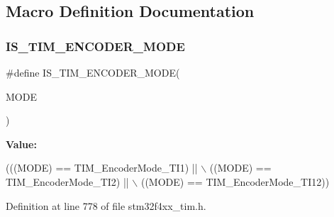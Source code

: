 \subsection{Macro Definition Documentation}
\mbox{\label{group___t_i_m___encoder___mode_ga9dd5baa6b2a44e0f25068a650cbfdd1b}} 
\subsubsection{\texorpdfstring{I\+S\+\_\+\+T\+I\+M\+\_\+\+E\+N\+C\+O\+D\+E\+R\+\_\+\+M\+O\+DE}{IS\_TIM\_ENCODER\_MODE}}
{\footnotesize\ttfamily \#define I\+S\+\_\+\+T\+I\+M\+\_\+\+E\+N\+C\+O\+D\+E\+R\+\_\+\+M\+O\+DE(\begin{DoxyParamCaption}\item[{}]{M\+O\+DE }\end{DoxyParamCaption})}

{\bfseries Value\+:}
\begin{DoxyCode}
(((MODE) == TIM\_EncoderMode\_TI1) || \(\backslash\)
                                   ((MODE) == TIM\_EncoderMode\_TI2) || \(\backslash\)
                                   ((MODE) == TIM\_EncoderMode\_TI12))
\end{DoxyCode}


Definition at line 778 of file stm32f4xx\+\_\+tim.\+h.


